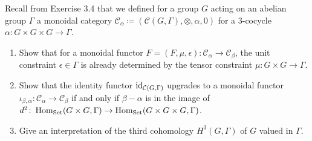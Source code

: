 \begin{Exercise}
	Recall from Exercise 3.4 that we defined for a group $ G $ acting on an abelian group $ \Gamma $ a monoidal category $ \mathcal{ C }_{ \alpha } \coloneqq ( \mathcal{ C } ( G , \Gamma ) , \otimes , \alpha , 0 ) $ for a 3-cocycle $ \alpha \colon G \times G \times G \to \Gamma $.
	
	\begin{enumerate}[label=(\alph*)]
		\item 
		Show that for a monoidal functor $ F = ( F , \mu , \epsilon ) \colon \mathcal{ C }_{ \alpha } \to \mathcal{ C }_{ \beta } $, the unit constraint $ \epsilon \in \Gamma $ is already determined by the tensor constraint $ \mu \colon G \times G \to \Gamma $.
		
		\item 
		Show that the identity functor $ \operatorname{id}_{ \mathcal{ C } ( G , \Gamma ) }$ upgrades to a monoidal functor $ \iota_{ \beta, \alpha } \colon \mathcal{ C }_{ \alpha } \to \mathcal{ C }_{ \beta } $ if and only if $\beta - \alpha $ is in the image of $ d^2 \colon \operatorname{Hom}_{ \operatorname{Set} } ( G \times G , \Gamma ) \to \operatorname{Hom}_{ \operatorname{Set} } ( G \times G \times G , \Gamma )$.
		
		\item 
		Give an interpretation of the third cohomology $ H^3 ( G , \Gamma ) $ of $ G $ valued in $ \Gamma $.
	\end{enumerate}
\end{Exercise}